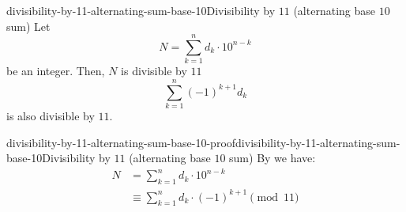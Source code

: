\documentclass[preview]{standalone}
\begin{document}
\begin{snippetproposition}{divisibility-by-11-alternating-sum-base-10}{Divisibility by \(11\) (alternating base \(10\) sum)}
    Let
    \[
        N = \sum_{k = 1}^n d_k \cdot 10^{n-k}
    \]
    be an integer. Then, \(N\) is divisible by \(11\) \ifandonlyif
    \[
        \sum_{k = 1}^n {(-1)}^{k+1} d_k
    \]
    is also divisible by \(11\).
\end{snippetproposition}

\begin{snippetproof}{divisibility-by-11-alternating-sum-base-10-proof}{divisibility-by-11-alternating-sum-base-10}{Divisibility by \(11\) (alternating base \(10\) sum)}
    By  we have:
    \begin{align*}
        N &= \sum_{k = 1}^n d_k \cdot 10^{n-k} \\
        &\equiv \sum_{k = 1}^n d_k \cdot {(-1)}^{k+1} \pmod{11}
    \end{align*}
\end{snippetproof}
\end{document}
